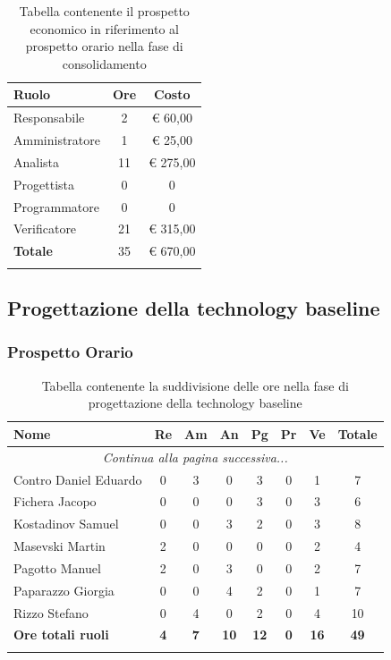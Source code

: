 \documentclass[../piano_di_progetto.tex]{subfiles}
\begin{document}
\begin{longtable}{|l|c|c|}
	\hline
	\rowcolor{lightgray}
	\textbf{Ruolo} & \textbf{Ore} & \textbf{Costo}\\
	\endhead
	\hline
	Responsabile & 2 & € 60,00 \\
	Amministratore & 1 & € 25,00 \\
	Analista & 11 & € 275,00 \\
	Progettista & 0 & 0 \\
	Programmatore & 0 & 0 \\
	Verificatore & 21 & € 315,00 \\
	\hline
	\textbf{Totale} & 35 & € 670,00 \\
	\hline
	\rowcolor{white}
	\caption{Tabella contenente il prospetto economico in riferimento al prospetto orario nella fase di consolidamento} 
\end{longtable}


\subsection{Progettazione della technology baseline}%
\label{sub:fase_prog_tech_base}
\subsubsection{Prospetto Orario}

\begin{center}
	\begin{longtable}{|l|c|c|c|c|c|c|c|}
		\hline
		\rowcolor{lightgray}
		\textbf{Nome} & \textbf{Re} & \textbf{Am} & \textbf{An} & \textbf{Pg}  & \textbf{Pr}   & \textbf{Ve} & \textbf{Totale} \\
		\hline
		\endhead
		
		\hline
		\multicolumn{8}{|c|}{\emph{Continua alla pagina successiva...}}\\
		\hline
		\endfoot

		\endlastfoot
		
		\hline
			Contro Daniel Eduardo & 0 & 3 & 0 & 3 & 0 & 1 & 7\\
			Fichera Jacopo & 0 & 0 & 0 & 3 & 0 & 3 & 6 \\
			Kostadinov Samuel & 0 & 0 & 3 & 2 & 0 & 3 & 8 \\			
			Masevski Martin 	& 2 & 0 & 0 & 0 & 0 & 2 & 4\\
			Pagotto Manuel & 2 & 0 & 3 & 0 & 0 & 2 & 7 \\			
			Paparazzo Giorgia & 0 & 0 & 4 & 2 & 0 & 1 & 7 \\
			Rizzo Stefano & 0 & 4 & 0 & 2 & 0 & 4 & 10\\
			\hline
		\textbf{Ore totali ruoli} & \textbf{4} & \textbf{7} & \textbf{10} & \textbf{12} & \textbf{0} & \textbf{16} & \textbf{49} \\
		\hline	
		\rowcolor{white}
		\caption{Tabella contenente la suddivisione delle ore nella fase di progettazione della technology baseline}
	\end{longtable}
\end{center}
\end{document}
